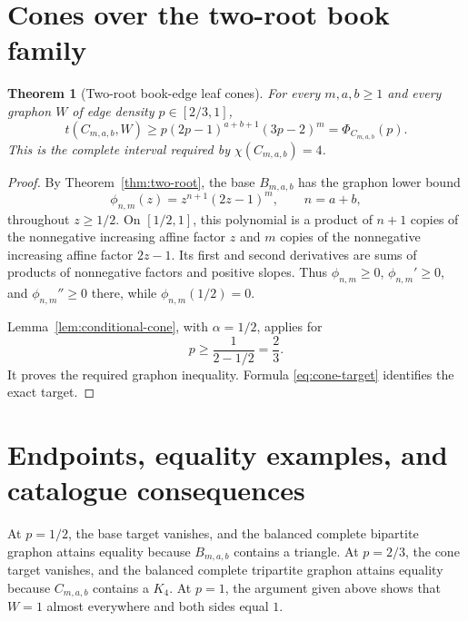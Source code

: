 \documentclass[11pt]{article}
\newtheorem{theorem}{Theorem}[section]
\begin{document}
\section{Cones over the two-root book family}

\begin{theorem}[Two-root book-edge leaf cones]
\label{thm:cones}
For every $m,a,b\geq1$ and every graphon $W$ of edge density
$p\in[2/3,1]$,
\[
 \boxed{
 t(C_{m,a,b},W)
 \geq p(2p-1)^{a+b+1}(3p-2)^m
 =\Phi_{C_{m,a,b}}(p).
 }
\]
This is the complete interval required by $\chi(C_{m,a,b})=4$.
\end{theorem}

\begin{proof}
By Theorem~\ref{thm:two-root}, the base $B_{m,a,b}$ has the graphon lower
bound
\[
 \phi_{n,m}(z)=z^{n+1}(2z-1)^m,
 \qquad n=a+b,
\]
throughout $z\geq1/2$.  On $[1/2,1]$, this polynomial is a product of
$n+1$ copies of the nonnegative increasing affine factor $z$ and $m$
copies of the nonnegative increasing affine factor $2z-1$.  Its first and
second derivatives are sums of products of nonnegative factors and
positive slopes.  Thus $\phi_{n,m}\geq0$, $\phi_{n,m}'\geq0$, and
$\phi_{n,m}''\geq0$ there, while $\phi_{n,m}(1/2)=0$.

Lemma~\ref{lem:conditional-cone}, with $\alpha=1/2$, applies for
\[
 p\geq\frac1{2-1/2}=\frac23.
\]
It proves the required graphon inequality.  Formula
\eqref{eq:cone-target} identifies the exact target.
\end{proof}


\section{Endpoints, equality examples, and catalogue consequences}

At $p=1/2$, the base target vanishes, and the balanced complete bipartite
graphon attains equality because $B_{m,a,b}$ contains a triangle.  At $p=2/3$,
the cone target vanishes, and the balanced complete tripartite graphon
attains equality because $C_{m,a,b}$ contains a $K_4$.  At $p=1$, the argument
given above shows that $W=1$ almost everywhere and both sides equal $1$.
\end{document}
